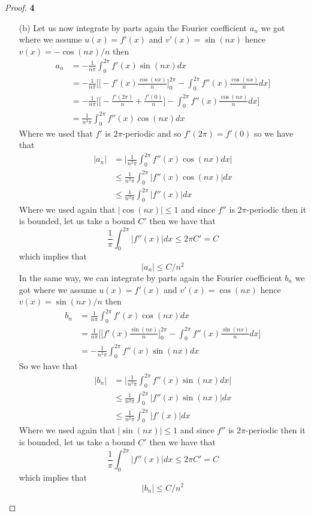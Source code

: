 \documentclass[11pt]{article}
\theoremstyle{definition}
\begin{document}
\begin{proof}{\textbf{4}}
\begin{itemize}
\cleardoublepage
    \item[(b)] Let us now integrate by parts again the Fourier coefficient $a_n$
    we got where we assume $u(x) = f'(x)$ and $v'(x) = \sin(nx)$
    hence $v(x) = -\cos(nx)/n$ then
    \begin{align*}
        a_n &= -\frac{1}{n\pi}\int_0^{2\pi}f'(x) \sin(nx) dx\\
        &= -\frac{1}{n\pi}\bigg[\bigg[
            -f'(x)\frac{\cos(nx)}{n}
        \bigg]_0^{2\pi}
        - \int_0^{2\pi}f''(x) \frac{\cos(nx)}{n} dx\bigg]\\
        &= -\frac{1}{n\pi}\bigg[\bigg[
            -\frac{f'(2\pi)}{n} + \frac{f'(0)}{n}
        \bigg]
        - \int_0^{2\pi}f''(x) \frac{\cos(nx)}{n} dx\bigg]\\
        &= \frac{1}{n^2\pi}\int_0^{2\pi}f''(x) \cos(nx) dx
    \end{align*}
    Where we used that $f'$ is $2\pi$-periodic and so $f'(2\pi) = f'(0)$ so
    we have that
    \begin{align*}
        |a_n| &= \bigg|\frac{1}{n^2\pi}\int_0^{2\pi}f''(x) \cos(nx) dx\bigg|\\
        &\leq \frac{1}{n^2\pi}\int_0^{2\pi}|f''(x)\cos(nx)| dx\\
        &\leq \frac{1}{n^2\pi}\int_0^{2\pi}|f''(x)| dx
    \end{align*}
    Where we used again that $|\cos(nx)| \leq 1$ and since $f''$ is
    $2\pi$-periodic then it is bounded, let us take a bound $C'$ then
    we have that
    $$\frac{1}{\pi}\int_0^{2\pi}|f''(x)| dx \leq 2\pi C'= C$$
    which implies that 
    $$|a_n| \leq C/n^2$$
    \cleardoublepage
    In the same way, we can integrate by parts again the Fourier coefficient
    $b_n$ we got where we assume $u(x) = f'(x)$ and $v'(x) = \cos(nx)$
    hence $v(x) = \sin(nx)/n$ then
    \begin{align*}
        b_n &= \frac{1}{n\pi}\int_0^{2\pi}f'(x) \cos(nx) dx\\
        &= \frac{1}{n\pi}\bigg[\bigg[f'(x)\frac{\sin(nx)}{n}\bigg]_0^{2\pi}
        - \int_0^{2\pi}f''(x) \frac{\sin(nx)}{n} dx\bigg]\\
        &= -\frac{1}{n^2\pi}\int_0^{2\pi}f''(x) \sin(nx) dx
    \end{align*}
    So we have that
    \begin{align*}
        |b_n| &= \bigg|\frac{1}{n^2\pi}\int_0^{2\pi}f''(x) \sin(nx) dx\bigg|\\
        &\leq \frac{1}{n^2\pi}\int_0^{2\pi}|f''(x)\sin(nx)| dx\\
        &\leq \frac{1}{n^2\pi}\int_0^{2\pi}|f'(x)| dx
    \end{align*}
    Where we used again that $|\sin(nx)| \leq 1$ and since $f''$ is
    $2\pi$-periodic then it is bounded, let us take a bound $C'$ then
    we have that
    $$\frac{1}{\pi}\int_0^{2\pi}|f''(x)| dx \leq 2\pi C' = C$$
    which implies that 
    $$|b_n| \leq C/n^2$$


\end{itemize}
\end{proof}
\end{document}
